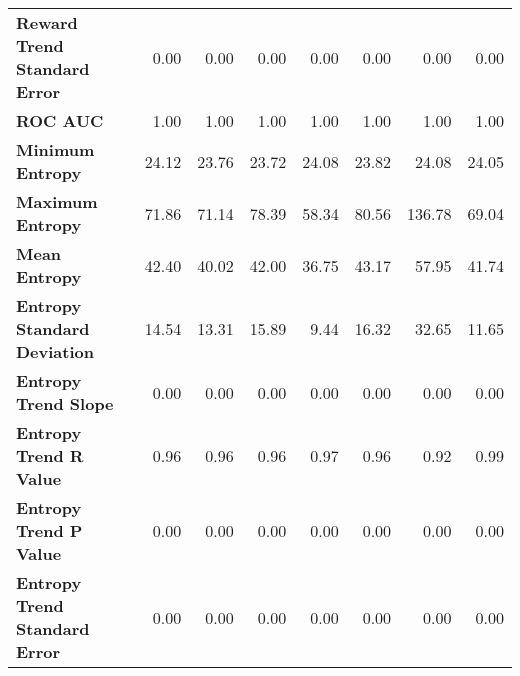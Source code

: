 \begin{tabular}{lrrrrrrr}
\textbf{Reward Trend Standard Error} & 0.00 & 0.00 & 0.00 & 0.00 & 0.00 & 0.00 & 0.00 \\
\textbf{ROC AUC} & 1.00 & 1.00 & 1.00 & 1.00 & 1.00 & 1.00 & 1.00 \\
\textbf{Minimum Entropy} & 24.12 & 23.76 & 23.72 & 24.08 & 23.82 & 24.08 & 24.05 \\
\textbf{Maximum Entropy} & 71.86 & 71.14 & 78.39 & 58.34 & 80.56 & 136.78 & 69.04 \\
\textbf{Mean Entropy} & 42.40 & 40.02 & 42.00 & 36.75 & 43.17 & 57.95 & 41.74 \\
\textbf{Entropy Standard Deviation} & 14.54 & 13.31 & 15.89 & 9.44 & 16.32 & 32.65 & 11.65 \\
\textbf{Entropy Trend Slope} & 0.00 & 0.00 & 0.00 & 0.00 & 0.00 & 0.00 & 0.00 \\
\textbf{Entropy Trend R Value} & 0.96 & 0.96 & 0.96 & 0.97 & 0.96 & 0.92 & 0.99 \\
\textbf{Entropy Trend P Value} & 0.00 & 0.00 & 0.00 & 0.00 & 0.00 & 0.00 & 0.00 \\
\textbf{Entropy Trend Standard Error} & 0.00 & 0.00 & 0.00 & 0.00 & 0.00 & 0.00 & 0.00 \\
\bottomrule
\end{tabular}
